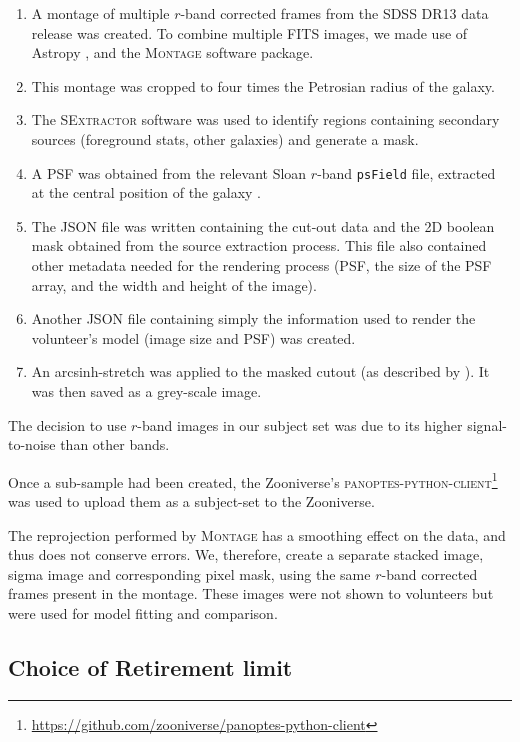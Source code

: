 \documentclass[trackchanges]{aastex63}
\begin{document}
\begin{enumerate}
\item A montage of multiple $r$-band corrected frames from the SDSS DR13 \citep{2017ApJS..233...25A} data release was created. To combine multiple FITS images, we made use of Astropy \citep{2018AJ....156..123A}, and the \textsc{Montage} \citep{2010arXiv1005.4454J} software package.
\item This montage was cropped to four times the Petrosian radius of the galaxy.
\item The \textsc{SExtractor} software \citep{source-extractor} was used to identify regions containing secondary sources (foreground stats, other galaxies) and generate a mask.
\item A PSF was obtained from the relevant Sloan $r$-band \texttt{psField} file, extracted at the central position of the galaxy \citep{2002AJ....123..485S}.
\item The JSON file was written containing the cut-out data and the 2D boolean mask obtained from the source extraction process. This file also contained other metadata needed for the rendering process (PSF, the size of the PSF array, and the width and height of the image).
\item Another JSON file containing simply the information used to render the volunteer's model (image size and PSF) was created.
\item An arcsinh-stretch was applied to the masked cutout (as described by \citealt{Lupton2003:astro-ph/0312483v1}). It was then saved as a grey-scale image.
\end{enumerate}

The decision to use $r$-band images in our subject set was due to its higher signal-to-noise than other bands.

Once a sub-sample had been created, the Zooniverse's \textsc{panoptes-python-client}\footnote{\url{https://github.com/zooniverse/panoptes-python-client}} was used to upload them as a subject-set to the Zooniverse.

The reprojection performed by \textsc{Montage} has a smoothing effect on the data, and thus does not conserve errors. We, therefore, create a separate stacked image, sigma image and corresponding pixel mask, using the same $r$-band corrected frames present in the montage. These images were not shown to volunteers but were used for model fitting and comparison.

\subsection{Choice of Retirement limit}
\label{sec:retirement-limit}
\end{document}
